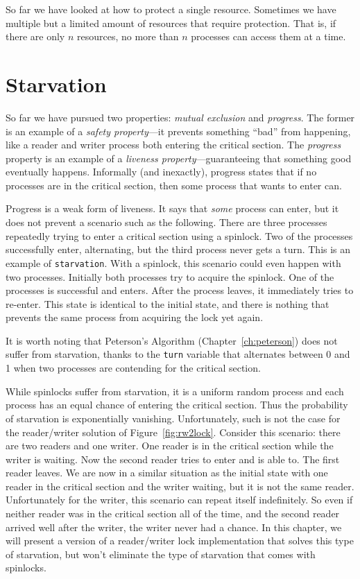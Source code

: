 \documentclass{report}
\begin{document}
So far we have looked at how to protect a single resource.  Sometimes
we have multiple but a limited amount of resources that require
protection.  That is, if there are only $n$ resources, no more than
$n$ processes can access them at a time.

\chapter{Starvation}

So far we have pursued two properties: \emph{mutual exclusion}
and \emph{progress}.  The former is an example of a
\emph{safety property}---it prevents something ``bad'' from
happening, like a reader and writer process both entering the
critical section.  The \emph{progress} property is an example
of a \emph{liveness property}---guaranteeing that something good
eventually happens.
Informally (and inexactly), progress states that if no processes
are in the critical section, then some process that wants to enter
can.

Progress is a weak form of liveness.  It says that \emph{some}
process can enter, but it does not prevent a scenario such as
the following.  There are three processes repeatedly trying to
enter a critical section using a spinlock.  Two of
the processes successfully enter, alternating, but the third
process never gets a turn.  This is an example of
\texttt{starvation}.  With a spinlock, this scenario could
even happen with two processes.  Initially both processes
try to acquire the spinlock.  One of the processes is
successful and enters.  After the process leaves, it immediately
tries to re-enter.  This state is identical to the initial
state, and there is nothing that prevents the same process
from acquiring the lock yet again.

It is worth noting that Peterson's Algorithm (Chapter~\ref{ch:peterson})
does not suffer from starvation, thanks to the \texttt{turn} variable
that alternates between 0 and 1 when two processes are contending for
the critical section.

While spinlocks suffer from starvation, it is a uniform random
process and each process has an equal chance of entering the critical
section.  Thus the probability of starvation is exponentially vanishing.
Unfortunately, such is not the case for the
reader/writer solution of Figure~\ref{fig:rw2lock}.
Consider this scenario: there are two readers and one writer.  One reader
is in the critical section while the writer is waiting.  Now the
second reader tries to enter and is able to.  The first reader leaves.
We are now in a similar situation as the initial state with one reader
in the critical section and the writer waiting, but it is not the same
reader.  Unfortunately for the writer, this scenario can repeat itself
indefinitely.  So even if neither reader was in the critical section
all of the time, and the second reader arrived well after the writer,
the writer never had a chance.
In this chapter, we will present a version of a reader/writer lock
implementation that solves this type of starvation, but won't eliminate
the type of starvation that comes with spinlocks.
\end{document}
